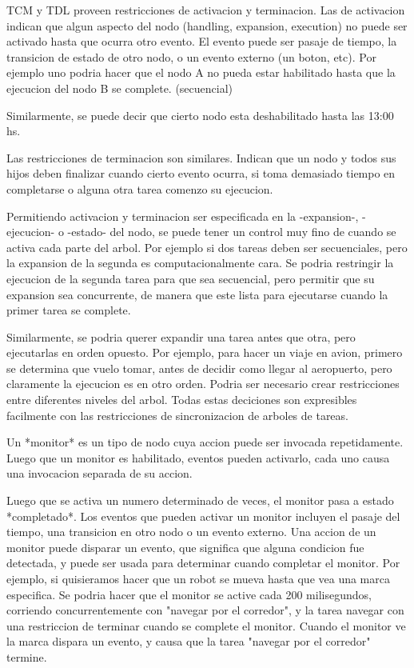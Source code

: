 \documentclass{article}
\begin{document}
TCM y TDL proveen restricciones de activacion y terminacion.
Las de activacion indican que algun aspecto del nodo (handling, 
expansion, execution) no puede
ser activado hasta que ocurra otro evento. 
El evento puede ser pasaje de tiempo, la transicion de estado de otro nodo,
o un evento externo (un boton, etc).
Por ejemplo uno podria hacer que el nodo A no pueda estar habilitado hasta 
que la ejecucion del nodo B se complete. (secuencial)

Similarmente, se puede decir que cierto nodo esta deshabilitado hasta las 13:00
 hs.

Las restricciones de terminacion son similares. Indican que un nodo y todos 
sus hijos deben finalizar cuando cierto evento ocurra, si
toma demasiado tiempo en completarse o alguna otra tarea comenzo su ejecucion.

Permitiendo activacion y terminacion ser especificada en la -expansion-, 
-ejecucion- o -estado- del nodo, se puede tener un control
muy fino de cuando se activa cada parte del arbol.
Por ejemplo si dos tareas deben ser secuenciales, pero la expansion de la 
segunda es computacionalmente cara. Se podria
restringir la ejecucion de la segunda tarea para que sea secuencial, pero 
permitir que su expansion sea concurrente, de manera
que este lista para ejecutarse cuando la primer tarea se complete.

Similarmente, se podria querer expandir una tarea antes que otra, pero 
ejecutarlas en orden opuesto. Por ejemplo, para hacer un
viaje en avion, primero se determina que vuelo tomar, antes de decidir como 
llegar al aeropuerto, pero claramente la ejecucion es en otro orden.
Podria ser necesario crear restricciones entre diferentes niveles del arbol.
Todas estas deciciones son expresibles facilmente con las restricciones de 
sincronizacion de arboles de tareas.


Un *monitor* es un tipo de nodo cuya accion puede ser invocada repetidamente. 
Luego que un monitor es habilitado, eventos
pueden activarlo, cada uno causa una invocacion separada de su accion.

Luego que se activa un numero determinado de veces, el monitor pasa a 
estado *completado*.
Los eventos que pueden activar un monitor incluyen el pasaje del tiempo, una 
transicion en otro nodo o un evento externo.
Una accion de un monitor puede disparar un evento, que significa que alguna 
condicion fue detectada, y puede ser usada para determinar
cuando completar el monitor.
Por ejemplo, si quisieramos hacer que un robot se mueva hasta que vea una 
marca especifica. Se podria hacer que el monitor se active cada 
200 milisegundos, corriendo concurrentemente con "navegar por el corredor", y 
la tarea navegar con una restriccion de terminar cuando
se complete el monitor.
Cuando el monitor ve la marca dispara un evento, y causa que la tarea "navegar 
por el corredor" termine.
\end{document}
